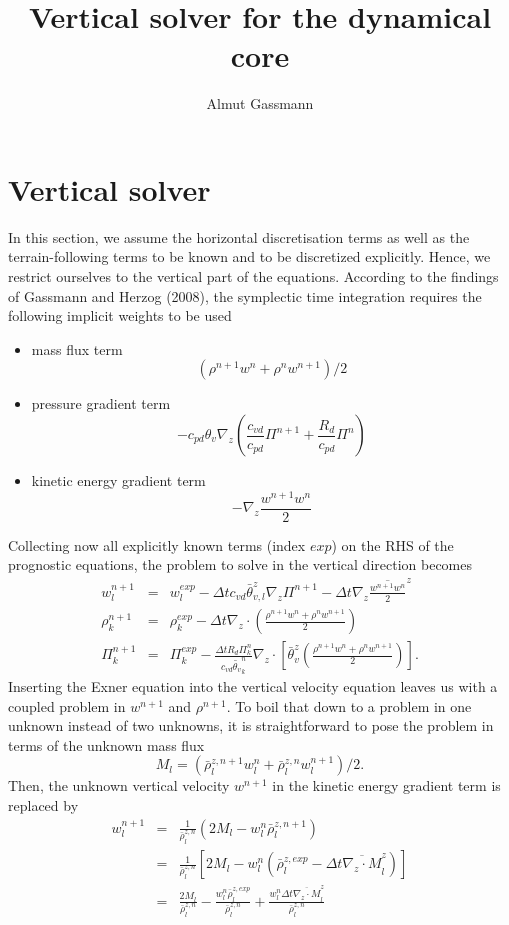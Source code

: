 \documentclass[a4paper,10pt]{article}
\title{Vertical solver for the dynamical core}
\author{Almut Gassmann}
\begin{document}
\section{Vertical solver}
In this section, we assume the horizontal discretisation terms as well as the terrain-following terms to be known and to be discretized explicitly. Hence, we restrict ourselves to the vertical part of the equations. According to the findings of Gassmann and Herzog (2008), the symplectic time integration requires the following implicit weights to be used
\begin{itemize}
 \item mass flux term
	$$(\rho^{n+1}w^n+\rho^nw^{n+1})/2$$
 \item pressure gradient term
	$$-c_{pd}\theta_v \nabla_z \left(\frac{c_{vd}}{c_{pd}}\Pi^{n+1}+
	\frac{R_d}{c_{pd}}\Pi^n\right)$$
 \item kinetic energy gradient term
	$$-\nabla_z\frac{w^{n+1}w^n}{2}$$
\end{itemize}
Collecting now all explicitly known terms (index $exp$) on the RHS of the prognostic equations, the problem to solve in the vertical direction becomes
\begin{eqnarray}
w^{n+1}_l&=&w^{exp}_l-\Delta t c_{vd}\bar\theta^z_{v,l}\nabla_z\Pi^{n+1}-\Delta t \nabla_z \overline{\frac{w^{n+1}w^n}{2}}^z\label{w_prog}\\
\rho^{n+1}_k&=&\rho^{exp}_k-\Delta t \nabla_z \cdot \left(\frac{\rho^{n+1}w^n+\rho^nw^{n+1}}{2}\right)\label{rho_prog}\\
\Pi^{n+1}_k&=&\Pi^{exp}_k-\frac{\Delta t R_d \Pi^n_k}{c_{vd}\widetilde{\theta_v}^n_k}\nabla_z\cdot\left[\bar\theta^z_v\left(\frac{\rho^{n+1}w^n+\rho^nw^{n+1}}{2}\right)\right]
\label{Pi_prog}.
\end{eqnarray}
Inserting the Exner equation into the vertical velocity equation leaves us with a coupled problem in $w^{n+1}$ and $\rho^{n+1}$. To boil that down to a problem in one unknown instead of two unknowns, it is straightforward to pose the problem in terms of the unknown mass flux
\begin{equation}
M_l =(\bar{\rho}^{z,n+1}_lw^n_l+\bar{\rho}^{z,n}_lw^{n+1}_l)/2. \label{massfl_prog}
\end{equation}
Then, the unknown vertical velocity $w^{n+1}$ in the kinetic energy gradient term is replaced by
\begin{eqnarray}
w^{n+1}_l &=& \frac{1}{\bar\rho^{z,n}_l}(2M_l-w^n_l\bar\rho^{z,n+1}_l)\label{w_replace}\\
&=&\frac{1}{\bar\rho^{z,n}_l}[2M_l-w^n_l(\bar\rho^{z,exp}_l-\Delta t \overline{\nabla_z \cdot M}^z_l)]\nonumber\\
&=&\frac{2M_l}{\bar\rho^{z,n}_l}-\frac{w^n_l\bar\rho^{z,exp}_l}{\bar\rho^{z,n}_l}+
\frac{w^n_l\Delta t \overline{\nabla_z \cdot M}^z_l}{\bar\rho^{z,n}_l}\nonumber
\end{eqnarray}
\end{document}
